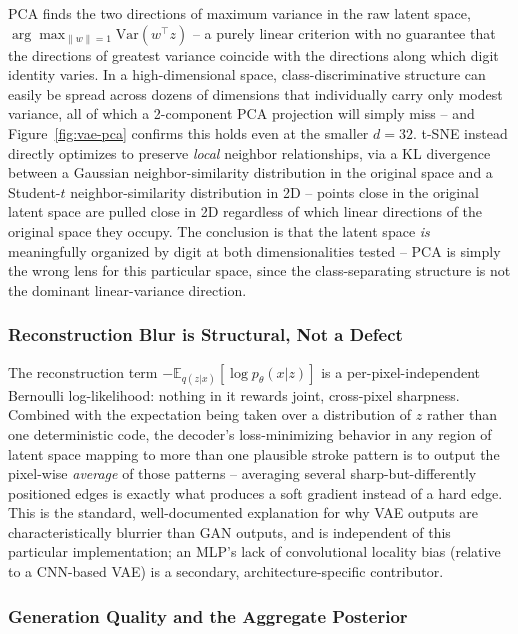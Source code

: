 PCA finds the two directions of maximum variance in the raw
latent space, $\arg\max_{\|w\|=1}\mathrm{Var}(w^\top z)$ -- a purely linear
criterion with no guarantee that the directions of greatest variance
coincide with the directions along which digit identity varies. In a
high-dimensional space, class-discriminative structure can easily be spread
across dozens of dimensions that individually carry only modest variance,
all of which a 2-component PCA projection will simply miss -- and
Figure~\ref{fig:vae-pca} confirms this holds even at the smaller $d=32$.
t-SNE instead directly optimizes to preserve \emph{local} neighbor
relationships, via a KL divergence between a Gaussian neighbor-similarity
distribution in the original space and a Student-$t$ neighbor-similarity
distribution in 2D -- points close in the original latent space are pulled
close in 2D regardless of which linear directions of the original space
they occupy. The conclusion is that the latent space \emph{is} meaningfully
organized by digit at both dimensionalities tested -- PCA is simply the
wrong lens for this particular space, since the class-separating structure
is not the dominant linear-variance direction.

\subsubsection{Reconstruction Blur is Structural, Not a Defect}

The reconstruction term $-\mathbb{E}_{q(z|x)}[\log p_\theta(x|z)]$ is a
per-pixel-independent Bernoulli log-likelihood: nothing in it rewards
joint, cross-pixel sharpness. Combined with the expectation being taken
over a distribution of $z$ rather than one deterministic code, the
decoder's loss-minimizing behavior in any region of latent space mapping to
more than one plausible stroke pattern is to output the pixel-wise
\emph{average} of those patterns -- averaging several sharp-but-differently
positioned edges is exactly what produces a soft gradient instead of a hard
edge. This is the standard, well-documented explanation for why VAE outputs
are characteristically blurrier than GAN outputs, and is independent of
this particular implementation; an MLP's lack of convolutional locality
bias (relative to a CNN-based VAE) is a secondary, architecture-specific
contributor.

\subsubsection{Generation Quality and the Aggregate Posterior}
\label{sec:vae-discussion-generation}

